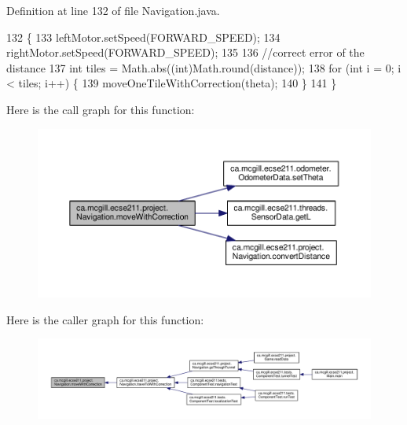 Definition at line 132 of file Navigation.\+java.


\begin{DoxyCode}
132                                                                              \{
133     leftMotor.setSpeed(FORWARD\_SPEED);
134     rightMotor.setSpeed(FORWARD\_SPEED);
135 
136     \textcolor{comment}{//correct error of the distance}
137     \textcolor{keywordtype}{int} tiles = Math.abs((\textcolor{keywordtype}{int})Math.round(distance));
138     \textcolor{keywordflow}{for} (\textcolor{keywordtype}{int} i = 0; i < tiles; i++) \{
139       moveOneTileWithCorrection(theta);
140     \}
141   \}
\end{DoxyCode}
Here is the call graph for this function\+:
\nopagebreak
\begin{figure}[H]
\begin{center}
\leavevmode
\includegraphics[width=350pt]{classca_1_1mcgill_1_1ecse211_1_1project_1_1_navigation_a48eeb9ae2da23664421e8da5642054c7_cgraph}
\end{center}
\end{figure}
Here is the caller graph for this function\+:
\nopagebreak
\begin{figure}[H]
\begin{center}
\leavevmode
\includegraphics[width=350pt]{classca_1_1mcgill_1_1ecse211_1_1project_1_1_navigation_a48eeb9ae2da23664421e8da5642054c7_icgraph}
\end{center}
\end{figure}
\mbox{\label{classca_1_1mcgill_1_1ecse211_1_1project_1_1_navigation_ae8530d181ffd790ff9dea5eeab54b1a1}} 
